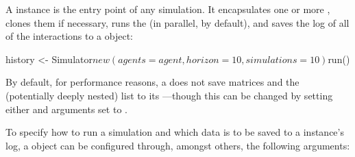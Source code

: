 \documentclass{jss}
\begin{document}
A  instance is the entry point of any  simulation. It encapsulates one or more , clones them if necessary, runs the  (in parallel, by default), and saves the log of all of the  interactions to a  object:

\begin{Code}
history <- Simulator$new(agents = agent, horizon = 10, simulations = 10)$run()
\end{Code}

By default, for performance reasons, a  does not save  matrices and the (potentially deeply nested)  list to its ---though this can be changed  by setting either  and  arguments set to .

To specify how to run a simulation and which data is to be saved to a  instance's  log, a  object can be configured through, amongst others, the following arguments:
\end{document}
